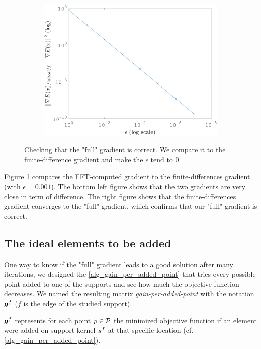 \begin{figure}[!ht]
\begin{subfigure}[b]{0.30\textwidth}
\end{subfigure}
\begin{subfigure}[b]{0.35\textwidth}\centering
\includegraphics[width=\textwidth]{figures/verif_gradient/finite-diff-vs-grad.png}
\end{subfigure}
\caption{Checking that the "full" gradient is correct. We compare it to the finite-difference gradient and make the $\epsilon$ tend to 0.} \label{fig_verif_gradient}
\end{figure}

Figure \ref{fig_verif_gradient} compares the FFT-computed gradient to the finite-differences gradient (with $\epsilon=0.001$). The bottom left figure shows that the two gradients are very close in term of difference. The right figure shows that the finite-differences gradient converges to the "full" gradient, which confirms that our "full" gradient is correct.

\subsection{The ideal elements to be added}\label{sec_gain_per_added_point}

One way to know if the "full" gradient leads to a good solution after many iterations, we designed the \cref{alg_gain_per_added_point} that tries every possible point added to one of the supports and see how much the objective function decreases. We named the resulting matrix \emph{gain-per-added-point} with the notation $\g^f$ ($f$ is the edge of the studied support).

$\g^f$ represents for each point $p \in \P$ the minimized objective function if an element were added on support kernel $\s^f$ at that specific location (cf. \cref{alg_gain_per_added_point}).

